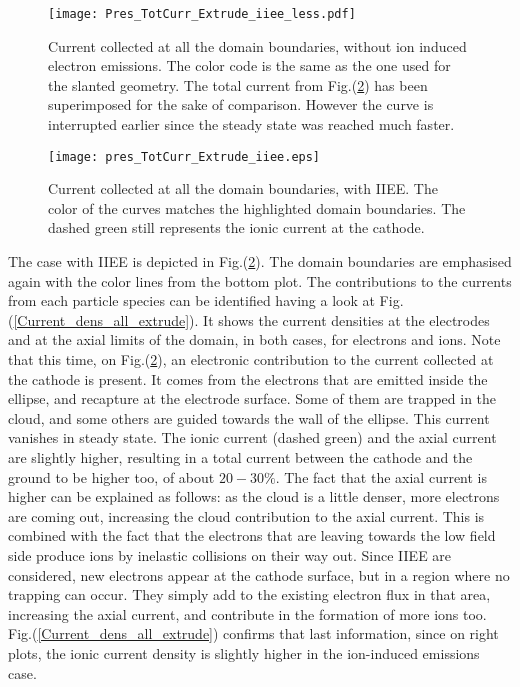 \begin{figure}[h!]
\centering
	\texttt{[image: Pres\_TotCurr\_Extrude\_iiee\_less.pdf]}
	\caption{\label{TotCurr_Extrude_iiee_less} Current collected at all the domain boundaries, without ion induced electron emissions. The color code is the same as the one used for the slanted geometry. The total current from Fig.(\ref{TotCurr_Extrude_iiee}) has been superimposed for the sake of comparison. However the curve is interrupted earlier since the steady state was reached much faster.}
\end{figure}

\begin{figure}[h!]
\centering
	\texttt{[image: pres\_TotCurr\_Extrude\_iiee.eps]}
	\caption{\label{TotCurr_Extrude_iiee} Current collected at all the domain boundaries, with IIEE. The color of the curves matches the highlighted domain boundaries. The dashed green still represents the ionic current at the cathode.  }
\end{figure}

\noindent The case with IIEE is depicted in Fig.(\ref{TotCurr_Extrude_iiee}). The domain boundaries are emphasised again with the color lines from the bottom plot. The contributions to the currents from each particle species can be identified having a look at Fig.(\ref{Current_dens_all_extrude}). It shows the current densities at the electrodes and at the axial limits of the domain, in both cases, for electrons and ions. Note that this time, on Fig.(\ref{TotCurr_Extrude_iiee}), an electronic contribution to the current collected at the cathode is present. It comes from the electrons that are emitted inside the ellipse, and recapture at the electrode surface. Some of them are trapped in the cloud, and some others are guided towards the wall of the ellipse. This current vanishes in steady state. The ionic current (dashed green) and the axial current are slightly higher, resulting in a total current between the cathode and the ground to be higher too, of about $20-30\%$. The fact that the axial current is higher can be explained as follows: as the cloud is a little denser, more electrons are coming out, increasing the cloud contribution to the axial current. This is combined with the fact that the electrons that are leaving towards the low field side produce ions by inelastic collisions on their way out. Since IIEE are considered, new electrons appear at the cathode surface, but in a region where no trapping can occur. They simply add to the existing electron flux in that area, increasing the axial current, and contribute in the formation of more ions too. Fig.(\ref{Current_dens_all_extrude}) confirms that last information, since on right plots, the ionic current density is slightly higher in the ion-induced emissions case. \\

